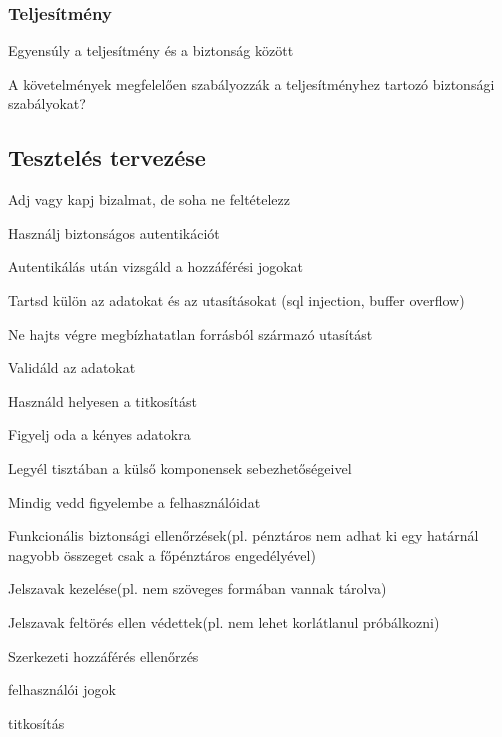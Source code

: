 \documentclass[a4paper,14pt, twocolumn]{extarticle}
\begin{document}
			\subsubsection{Teljesítmény}
				\begin{compactitem}
					\item Egyensúly a teljesítmény és a biztonság között 
					\item A követelmények megfelelően szabályozzák a teljesítményhez tartozó biztonsági szabályokat?
				\end{compactitem}
				\newpage 
				
		\subsection{Tesztelés tervezése}
		\begin{compactitem}
			\item Adj vagy kapj bizalmat, de soha ne feltételezz  
			\item Használj biztonságos autentikációt 
			\item Autentikálás után vizsgáld a hozzáférési jogokat 
			\item Tartsd külön az adatokat és az utasításokat (sql injection, buffer overflow) 
			\item Ne hajts végre megbízhatatlan forrásból származó utasítást 
			\item Validáld az adatokat 
			\item Használd helyesen a titkosítást 
			\item Figyelj oda a kényes adatokra 
			\item Legyél tisztában a külső komponensek sebezhetőségeivel 
			\item Mindig vedd figyelembe a felhasználóidat
			\item Funkcionális biztonsági ellenőrzések(pl. pénztáros nem adhat ki egy határnál nagyobb összeget csak a főpénztáros engedélyével)
			{
				\begin{compactitem}
					\item Jelszavak kezelése(pl. nem szöveges formában vannak tárolva) 
					\item Jelszavak feltörés ellen védettek(pl. nem lehet korlátlanul próbálkozni)
				\end{compactitem}
			}
			\item Szerkezeti hozzáférés ellenőrzés
				{
				\begin{compactitem}
					\item felhasználói jogok 
					\item titkosítás

\end{compactitem}}
\end{compactitem}
\end{document}

